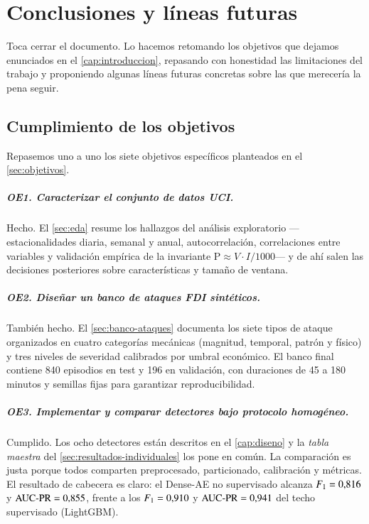 \chapter{Conclusiones y líneas futuras}
\label{cap:conclusiones}

Toca cerrar el documento. Lo hacemos retomando los objetivos que dejamos enunciados en el \cref{cap:introduccion}, repasando con honestidad las limitaciones del trabajo y proponiendo algunas líneas futuras concretas sobre las que merecería la pena seguir.

\section{Cumplimiento de los objetivos}
\label{sec:cumplimiento}

Repasemos uno a uno los siete objetivos específicos planteados en el \cref{sec:objetivos}.

\paragraph{OE1. Caracterizar el conjunto de datos UCI.}
Hecho. El \cref{sec:eda} resume los hallazgos del análisis exploratorio ---estacionalidades diaria, semanal y anual, autocorrelación, correlaciones entre variables y validación empírica de la invariante $\mathrm{P} \approx V \cdot I / 1000$--- y de ahí salen las decisiones posteriores sobre características y tamaño de ventana.

\paragraph{OE2. Diseñar un banco de ataques FDI sintéticos.}
También hecho. El \cref{sec:banco-ataques} documenta los siete tipos de ataque organizados en cuatro categorías mecánicas (magnitud, temporal, patrón y físico) y tres niveles de severidad calibrados por umbral económico. El banco final contiene 840 episodios en test y 196 en validación, con duraciones de 45 a 180 minutos y semillas fijas para garantizar reproducibilidad.

\paragraph{OE3. Implementar y comparar detectores bajo protocolo homogéneo.}
Cumplido. Los ocho detectores están descritos en el \cref{cap:diseno} y la \textit{tabla maestra} del \cref{sec:resultados-individuales} los pone en común. La comparación es justa porque todos comparten preprocesado, particionado, calibración y métricas. El resultado de cabecera es claro: el Dense-AE no supervisado alcanza $F_{1}=0{,}816$ y $\text{AUC-PR}=0{,}855$, frente a los $F_{1}=0{,}910$ y $\text{AUC-PR}=0{,}941$ del techo supervisado (LightGBM).

